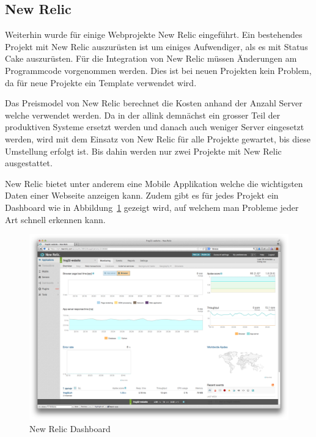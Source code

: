 \subsection{New Relic}
\label{sub:new_relic}
Weiterhin wurde für einige Webprojekte New Relic eingeführt. Ein bestehendes Projekt mit New Relic auszurüsten ist um einiges Aufwendiger, als es mit Status Cake auszurüsten. Für die Integration von New Relic müssen Änderungen am Programmcode vorgenommen werden. Dies ist bei neuen Projekten kein Problem, da für neue Projekte ein Template verwendet wird.

Das Preismodel von New Relic berechnet die Kosten anhand der Anzahl Server welche verwendet werden. Da in der allink demnächst ein grosser Teil der produktiven Systeme ersetzt werden und danach auch weniger Server eingesetzt werden, wird mit dem Einsatz von New Relic für alle Projekte gewartet, bis diese Umstellung erfolgt ist. Bis dahin werden nur zwei Projekte mit New Relic ausgestattet.

New Relic bietet unter anderem eine Mobile Applikation welche die wichtigsten Daten einer Webseite anzeigen kann. Zudem gibt es für jedes Projekt ein Dashboard wie in Abbildung~\ref{fig:new_relic_dashboard} gezeigt wird, auf welchem man Probleme jeder Art schnell erkennen kann.

\begin{figure}[ht]
\centering
\includegraphics[width=1\textwidth]{images/new_relic.png}
\caption{New Relic Dashboard}
\label{fig:new_relic_dashboard}
\end{figure}


